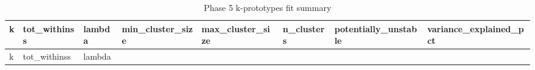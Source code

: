 \documentclass[
]{article}
\begin{document}
\begin{longtable}[]{@{}
  >{\raggedleft\arraybackslash}p{}
  >{\raggedleft\arraybackslash}p{}
  >{\raggedleft\arraybackslash}p{}
  >{\raggedleft\arraybackslash}p{}
  >{\raggedleft\arraybackslash}p{}
  >{\raggedleft\arraybackslash}p{}
  >{\raggedright\arraybackslash}p{}
  >{\raggedleft\arraybackslash}p{}@{}}
\caption{Phase 5 k-prototypes fit summary}\tabularnewline
\toprule\noalign{}
\begin{minipage}[b]{\linewidth}\raggedleft
k
\end{minipage} & \begin{minipage}[b]{\linewidth}\raggedleft
tot\_withinss
\end{minipage} & \begin{minipage}[b]{\linewidth}\raggedleft
lambda
\end{minipage} & \begin{minipage}[b]{\linewidth}\raggedleft
min\_cluster\_size
\end{minipage} & \begin{minipage}[b]{\linewidth}\raggedleft
max\_cluster\_size
\end{minipage} & \begin{minipage}[b]{\linewidth}\raggedleft
n\_clusters
\end{minipage} & \begin{minipage}[b]{\linewidth}\raggedright
potentially\_unstable
\end{minipage} & \begin{minipage}[b]{\linewidth}\raggedleft
variance\_explained\_pct
\end{minipage} \\
\midrule\noalign{}
\endfirsthead
\toprule\noalign{}
\begin{minipage}[b]{\linewidth}\raggedleft
k
\end{minipage} & \begin{minipage}[b]{\linewidth}\raggedleft
tot\_withinss
\end{minipage} & \begin{minipage}[b]{\linewidth}\raggedleft
lambda
\end{minipage} & \begin{minipage}[b]{\linewidth}\raggedleft

\end{minipage}
\end{longtable}
\end{document}

